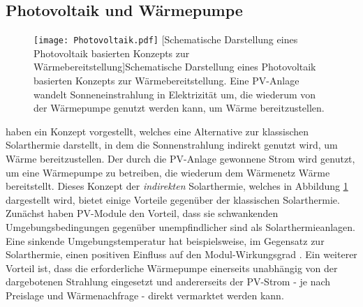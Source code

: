 \subsection*{Photovoltaik und Wärmepumpe}\label{subsection: Konzepte - Photovoltaik und Wärmepumpe}
	\begin{figure}[ht]
		\centering
		\texttt{[image: Photovoltaik.pdf]}
		[Schematische Darstellung eines Photovoltaik basierten Konzepts zur Wärmebereitstellung]{Schematische Darstellung eines Photovoltaik basierten Konzepts zur Wärmebereitstellung. Eine \ac{PV}-Anlage wandelt Sonneneinstrahlung in Elektrizität um, die wiederum von der Wärmepumpe genutzt werden kann, um Wärme bereitzustellen.}
		\label{Abbildung: PV-Konzept}
	\end{figure}
\citet{GRAVELSINS2019} haben ein Konzept vorgestellt, welches eine Alternative zur klassischen Solarthermie darstellt, in dem die Sonnenstrahlung indirekt genutzt wird, um Wärme bereitzustellen. Der durch die \ac{PV}-Anlage gewonnene Strom wird genutzt, um eine Wärmepumpe zu betreiben, die wiederum dem Wärmenetz Wärme bereitstellt. Dieses Konzept der \textit{indirekten} Solarthermie, welches in Abbildung \ref{Abbildung: PV-Konzept} dargestellt wird, bietet einige Vorteile gegenüber der klassischen Solarthermie. Zunächst haben \ac{PV}-Module den Vorteil, dass sie schwankenden Umgebungsbedingungen gegenüber unempfindlicher sind als Solarthermieanlagen. Eine sinkende Umgebungstemperatur hat beispielsweise, im Gegensatz zur Solarthermie, einen positiven Einfluss auf den Modul-Wirkungsgrad \cite{Quaschning2015}. Ein weiterer Vorteil ist, dass  die erforderliche Wärmepumpe einerseits unabhängig von der dargebotenen Strahlung eingesetzt und andererseits der \ac{PV}-Strom - je nach Preislage und Wärmenachfrage - direkt vermarktet werden kann.  

